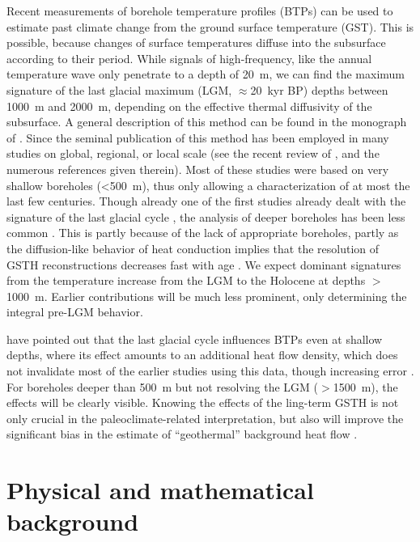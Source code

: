 \documentclass[cp]{copernicus}
\begin{document}
\introduction 
\label{sec:intro}
Recent measurements of borehole temperature profiles (BTPs) can be used to estimate past climate 
change from the ground surface temperature (GST). This is possible, because changes of surface 
temperatures diffuse into the sub­surface according to their period. While signals of 
high-frequency, like the annual temperature wave only pene­trate to a depth of 20~m, we can find 
the 
maximum signature of the last glacial maximum (LGM, $\approx$20~kyr BP) depths between 1000~m and 
2000~m, depending on the effective thermal diffusivity of the subsurface. A general de­scription of 
this method can be found in the monograph of \citet{Bodri2007a}. Since the seminal publi­cation of 
\citet{Lachenbruch1986a} this method has been employed in many studies on global, regional, or 
local 
scale (see the recent review of \citet{Gonzalez-Rouco2009a}, and the numerous references given 
therein). Most of these studies were based on very shallow boreholes (<500~m), thus only allowing a 
characterization of at most the last few centuries. Though already one of the first studies already 
dealt with the signature of the last glacial cycle \citep{Hotchkiss1934a}, the analysis of deeper 
boreholes has been less common 
\citep{Demezhko2014a, Kukkonen2011a, Kukkonen2011b, Chouinard2009a, Majorowicz2008a, Rath2007a,
Mottaghy2006a, Demezhko2001a, Clauser1995a}. This is partly because of the lack of appropriate 
boreholes, partly 
as the diffusion-like behavior of heat conduction implies that the resolution of GSTH 
reconstructions decreases fast with age \cite[e.g.][]{Demezhko2001a}. We expect dominant signatures 
from the temperature increase from the LGM to the Holocene at depths $>$1000~m. Earlier 
contributions will be much less prominent, only determining the integral pre-LGM behavior. 

\citet{Rath2012a} have pointed out that the last glacial cycle influences BTPs even at shallow 
depths, where its effect amounts to an additional heat flow density, which does not invalidate most 
of the earlier studies using this data, though increasing error \citep{Beltrami2011a, Rath2012a}. 
For boreholes deeper than 500~m but not resolving the LGM ($>$1500~m), the effects will be clearly 
visible. Knowing the effects of the ling-term GSTH is not only crucial in the paleoclimate-related 
interpretation, but also will improve the significant bias in the estimate of ``geothermal'' 
background heat­ flow \cite[e.g.][]{Westaway2013a,Majorowicz2011a,Slagstad2009a}. 


\section{Physical and mathematical background}
\end{document}
